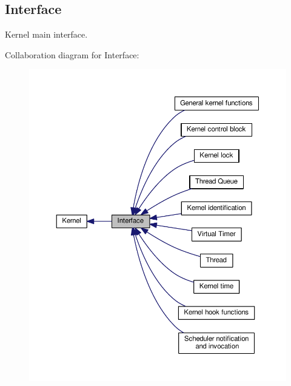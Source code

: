 \hypertarget{group__kern__intf}{\subsection{Interface}
\label{group__kern__intf}
}


Kernel main interface.  


Collaboration diagram for Interface\-:\nopagebreak
\begin{figure}[H]
\begin{center}
\leavevmode
\includegraphics[width=350pt]{group__kern__intf}
\end{center}
\end{figure}
